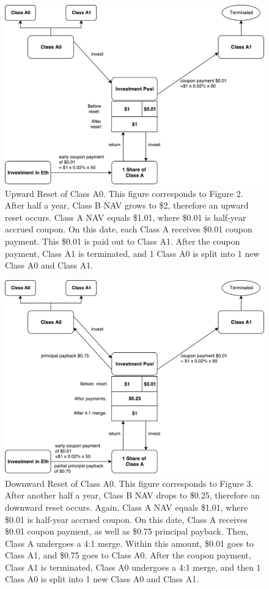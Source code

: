 \documentclass[10pt]{amsart}
\begin{document}
\begin{figure}
\includegraphics[width=\textwidth]{A0_upward.pdf}
\caption{Upward Reset of Class A0. This figure corresponds to Figure 2. After half a year, Class B NAV grows to \$2, therefore an upward reset occurs. Class A NAV equals \$1.01, where \$0.01 is half-year accrued coupon. On this date, each Class A receives \$0.01 coupon payment. This \$0.01 is paid out to Class A1. After the coupon payment, Class A1 is terminated, and 1 Class A0 is split into 1 new Class A0 and Class A1.}
\end{figure}

\begin{figure}
\includegraphics[width=\textwidth]{A0_downward.pdf}
\caption{Downward Reset of Class A0. This figure corresponds to Figure 3. After another half a year, Class B NAV drops to \$0.25, therefore an downward reset occurs. Again, Class A NAV equals \$1.01, where \$0.01 is half-year accrued coupon. On this date, Class A receives \$0.01 coupon payment, as well as \$0.75 principal payback. Then, Class A undergoes a 4:1 merge. Within this amount, \$0.01 goes to Class A1, and \$0.75 goes to Class A0. After the coupon payment, Class A1 is terminated, Class A0 undergoes a 4:1 merge, and then 1 Class A0 is split into 1 new Class A0 and Class A1.}
\end{figure}
\end{document}
